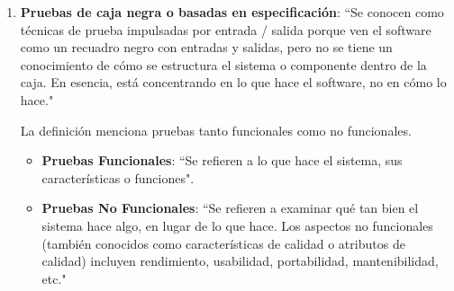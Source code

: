 \begin{enumerate}
	\item \textbf {Pruebas de caja negra o basadas en especificación}: ``Se conocen como técnicas de prueba impulsadas por entrada / salida porque ven el software como un recuadro negro con entradas y salidas, pero no se tiene un conocimiento de cómo se estructura el sistema o componente dentro de la caja. En esencia, está concentrando en lo que hace el software, no en cómo lo hace."
	
		La definición menciona pruebas tanto funcionales como no funcionales.
		\begin{itemize}
			\item \textbf {Pruebas Funcionales}: ``Se refieren a lo que hace el sistema, sus características o funciones".
			\item \textbf {Pruebas No Funcionales}: ``Se refieren a examinar qué tan bien el sistema hace algo, en lugar de lo que hace. Los aspectos no funcionales (también conocidos como características de calidad o atributos de calidad) incluyen rendimiento, usabilidad, portabilidad, mantenibilidad, etc."
		\end{itemize}
	

\end{enumerate}
